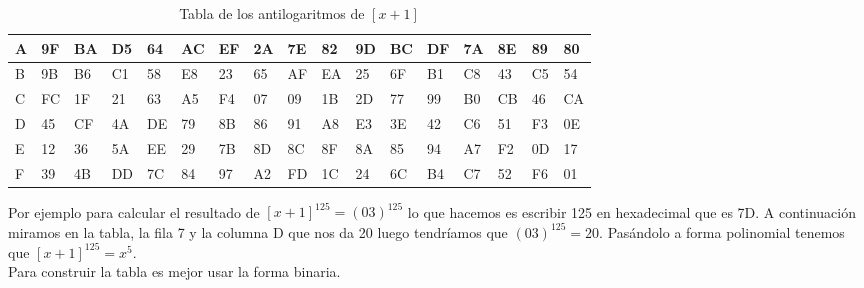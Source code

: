 \begin{table}[!htb]
{\begin{tabular}{|l|l|l|l|l|l|l|l|l|l|l|l|l|l|l|l|l|}
A                      & 9F & BA & D5 & 64 & AC & EF & 2A & 7E & 82 & 9D & BC & DF & 7A & 8E & 89 & 80 \\ \hline
B                      & 9B & B6 & C1 & 58 & E8 & 23 & 65 & AF & EA & 25 & 6F & B1 & C8 & 43 & C5 & 54 \\ \hline
C                      & FC & 1F & 21 & 63 & A5 & F4 & 07 & 09 & 1B & 2D & 77 & 99 & B0 & CB & 46 & CA \\ \hline
D                      & 45 & CF & 4A & DE & 79 & 8B & 86 & 91 & A8 & E3 & 3E & 42 & C6 & 51 & F3 & 0E \\ \hline
E                      & 12 & 36 & 5A & EE & 29 & 7B & 8D & 8C & 8F & 8A & 85 & 94 & A7 & F2 & 0D & 17 \\ \hline
F                      & 39 & 4B & DD & 7C & 84 & 97 & A2 & FD & 1C & 24 & 6C & B4 & C7 & 52 & F6 & 01 \\ \hline
\end{tabular}}
	\label{antilogaritmos}
\caption{Tabla de los antilogaritmos de $[x+1]$}
\end{table}
Por ejemplo para calcular el resultado de $[x+1]^{125}=(03)^{125}$ lo que hacemos es escribir 125 en hexadecimal que es 7D. A continuación miramos en la tabla, la fila 7 y la columna D que nos da 20 luego tendríamos que $(03)^{125}=20$. Pasándolo a forma polinomial tenemos que $[x+1]^{125}=x^5$.\\
Para construir la tabla es mejor usar la forma binaria.\\

